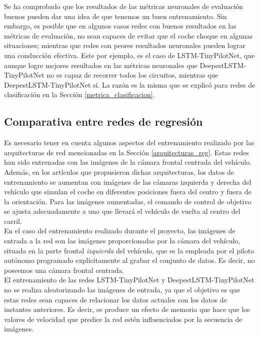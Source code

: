 Se ha comprobado que los resultados de las métricas neuronales de evaluación buenos pueden dar una idea de que tenemos un buen entrenamiento. Sin embargo, es posible que en algunos casos redes con buenos resultados en las métricas de evaluación, no sean capaces de evitar que el coche choque en algunas situaciones; mientras que redes con peores resultados neuronales pueden lograr una conducción efectiva. Este por ejemplo, es el caso de LSTM-TinyPilotNet, que aunque logre mejores resultados en las métricas neuronales que DeepestLSTM-TinyPilotNet no es capaz de recorrer todos los circuitos, mientras que DeepestLSTM-TinyPilotNet sí. La razón es la misma que se explicó para redes de clasificación en la Sección \ref{metrica_clasificacion}.\\




\subsection{Comparativa entre redes de regresión}\label{comparativa}

Es necesario tener en cuenta algunos aspectos del entrenamiento realizado por las arquitecturas de red mencionadas en la Sección \ref{arquitecturas_reg}. Estas redes han sido entrenadas con las imágenes de la cámara frontal centrada del vehículo. Además, en los artículos que propusieron dichas arquitecturas, los datos de entrenamiento se aumentan con imágenes de las cámaras izquierda y derecha del vehículo que simulan el coche en diferentes posiciones fuera del centro y fuera de la orientación. Para las imágenes aumentadas, el comando de control de objetivo se ajusta adecuadamente a uno que llevará el vehículo de vuelta al centro del carril.\\

En el caso del entrenamiento realizado durante el proyecto, las imágenes de entrada a la red son las imágenes proporcionadas por la cámara del vehículo, situada en la parte frontal \textit{izquierda} del vehículo, que es la empleada por el piloto autónomo programado explícitamente al grabar el conjunto de datos. Es decir, no poseemos una cámara frontal centrada.\\ 

El entrenamiento de las redes LSTM-TinyPilotNet y DeepestLSTM-TinyPilotNet no se realiza aleatorizando las imágenes de entrada, ya que el objetivo es que estas redes sean capaces de relacionar los datos actuales con los datos de instantes anteriores. Es decir, se produce un efecto de memoria que hace que los valores de velocidad que predice la red estén influenciados por la secuencia de imágenes.\\


